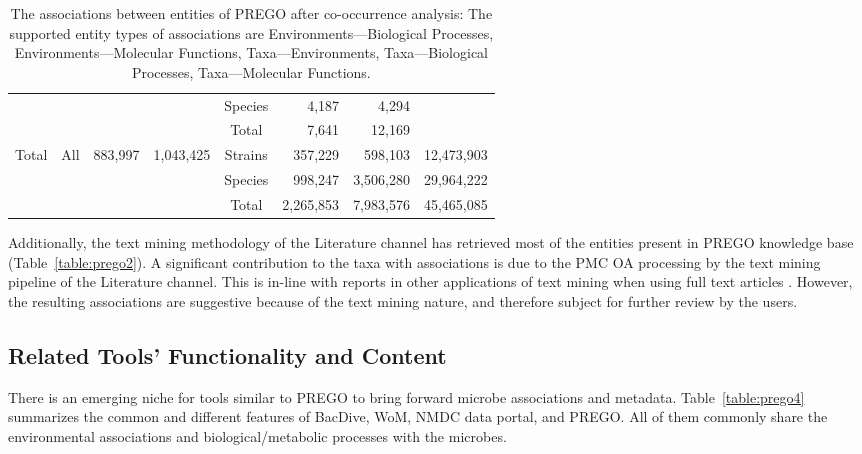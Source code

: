 {\begin{sidewaystable}
\begin{tabular}{@{}cccccrcr@{}}
      &  &  &  & Species & 4,187 & \multicolumn{1}{r}{4,294} & \multicolumn{1}{l}{} \\
      &  &  &  & Total & 7,641 & \multicolumn{1}{r}{12,169} & \multicolumn{1}{l}{} \\
      \multirow{3}{*}{Total} & \multirow{3}{*}{All} & \multirow{3}{*}{883,997} & \multirow{3}{*}{1,043,425} & Strains & 357,229 & \multicolumn{1}{r}{598,103} & 12,473,903 \\
      &  &  &  & Species & 998,247 & \multicolumn{1}{r}{3,506,280} & 29,964,222 \\
      &  &  &  & Total & 2,265,853 & \multicolumn{1}{r}{7,983,576} & 45,465,085 \\ \cmidrule(l){5-8} 
      \end{tabular}
      \caption[Associations among the PREGO entities]{
         The associations between entities of PREGO after co-occurrence analysis: The supported entity types of associations are Environments—Biological Processes, Environments—Molecular Functions, Taxa—Environments, Taxa—Biological Processes, Taxa—Molecular Functions.
      }
      \label{table:prego3}
   \end{sidewaystable}

   Additionally, the text mining methodology of the Literature channel has retrieved most of the entities present in PREGO knowledge base (Table~\ref{table:prego2}). 
   A significant contribution to the taxa with associations is due to the PMC OA processing by the text mining pipeline of the Literature channel. 
   This is in-line with reports in other applications of text mining when using full text articles \cite{westergaard2018comprehensive}. 
   However, the resulting associations are suggestive because of the text mining nature, and therefore subject for further review by the users.

   \subsection{Related Tools' Functionality and Content}
   \label{subsec:prego-similar-platforms}

   There is an emerging niche for tools similar to PREGO to bring forward microbe associations and metadata. 
   Table~\ref{table:prego4} summarizes the common and different features of BacDive, WoM, NMDC data portal, and PREGO. 
   All of them commonly share the environmental associations and biological/metabolic processes with the microbes.

}
